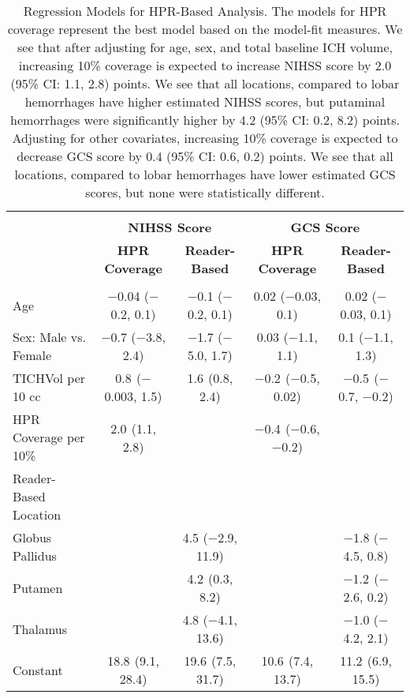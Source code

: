 
\begin{table}[!htbp] \centering 
\begin{tabular}{@{\extracolsep{5pt}}l@{}c@{}c|@{}c@{}c} 
\\[-1.8ex]\hline 
\\[-1.8ex] & \multicolumn{2}{c|}{\textbf{NIHSS Score}} & \multicolumn{2}{c}{\textbf{GCS Score}} \\ 
 & \textbf{HPR Coverage} & \textbf{Reader-Based} & \textbf{HPR Coverage} & \textbf{Reader-Based} \\ 
\hline \\[-1.8ex] 
 Age & $-$0.04 ($-$0.2, 0.1) & $-$0.1 ($-$0.2, 0.1) & 0.02 ($-$0.03, 0.1) & 0.02 ($-$0.03, 0.1) \\ 
  Sex: Male vs. Female & $-$0.7 ($-$3.8, 2.4) & $-$1.7 ($-$5.0, 1.7) & 0.03 ($-$1.1, 1.1) & 0.1 ($-$1.1, 1.3) \\ 
  TICHVol per 10 cc & 0.8$^{}$ ($-$0.003, 1.5) & 1.6$^{}$ (0.8, 2.4) & $-$0.2$^{}$ ($-$0.5, 0.02) & $-$0.5$^{}$ ($-$0.7, $-$0.2) \\ 
  HPR Coverage per 10\% & 2.0$^{}$ (1.1, 2.8) &  & $-$0.4$^{}$ ($-$0.6, $-$0.2) &  \\ 
  Reader-Based Location&&&& \\
\;\;Globus Pallidus &  & 4.5 ($-$2.9, 11.9) &  & $-$1.8 ($-$4.5, 0.8) \\ 
  \;\;Putamen &  & 4.2$^{}$ (0.3, 8.2) &  & $-$1.2$^{}$ ($-$2.6, 0.2) \\ 
  \;\;Thalamus &  & 4.8 ($-$4.1, 13.6) &  & $-$1.0 ($-$4.2, 2.1) \\ 
  Constant & 18.8$^{}$ (9.1, 28.4) & 19.6$^{}$ (7.5, 31.7) & 10.6$^{}$ (7.4, 13.7) & 11.2$^{}$ (6.9, 15.5) \\ 
\hline 
\end{tabular} 
  \caption{Regression Models for HPR-Based Analysis. The models for HPR coverage represent the best model based on the model-fit measures. We see that after adjusting for age, sex, and total baseline ICH volume, increasing 10\% coverage is expected to increase NIHSS score by 2.0 (95\% CI: 1.1, 2.8) points.  We see that all locations, compared to lobar hemorrhages have higher estimated NIHSS scores, but putaminal hemorrhages were significantly higher by 4.2 (95\% CI: 0.2, 8.2) points. Adjusting for other covariates, increasing 10\% coverage is expected to decrease GCS score by 0.4 (95\% CI: 0.6, 0.2) points.  We see that all locations, compared to lobar hemorrhages have lower estimated GCS scores, but none were statistically different.} 
  \label{f:beta} 
\end{table} 
